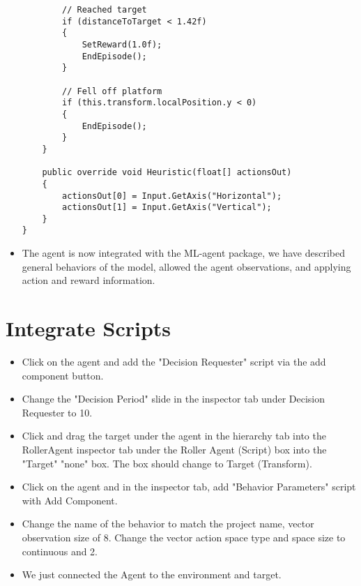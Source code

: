\documentclass[11pt,fleqn,openany]{book} %
\begin{document}
\begin{itemize}
\begin{verbatim}
        // Reached target
        if (distanceToTarget < 1.42f)
        {
            SetReward(1.0f);
            EndEpisode();
        }

        // Fell off platform
        if (this.transform.localPosition.y < 0)
        {
            EndEpisode();
        }
    }
    
    public override void Heuristic(float[] actionsOut)
    {
        actionsOut[0] = Input.GetAxis("Horizontal");
        actionsOut[1] = Input.GetAxis("Vertical");
    }
}
    \end{verbatim}
    \item The agent is now integrated with the ML-agent package, we have described general behaviors of the model, allowed the agent observations, and applying action and reward information.
\end{itemize}

\section{Integrate Scripts}
\begin{itemize}
    \item Click on the agent and add the "Decision Requester" script via the add component button.
    \item Change the "Decision Period" slide in the inspector tab under Decision Requester to 10.
    \item Click and drag the target under the agent in the hierarchy tab into the RollerAgent inspector tab under the Roller Agent (Script) box into the "Target" "none" box. The box should change to Target (Transform). 
    \item Click on the agent and in the inspector tab, add "Behavior Parameters" script with Add Component.
    \item Change the name of the behavior to match the project name, vector observation size of 8. Change the vector action space type and space size to continuous and 2.
    \item We just connected the Agent to the environment and target.
\end{itemize}
\end{document}
